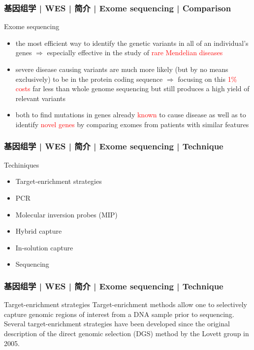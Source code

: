 \begin{frame}
  \frametitle{基因组学 | WES | 简介 | Exome sequencing | Comparison}
  \begin{block}{Exome sequencing}
    \begin{itemize}
      \item the most efficient way to identify the genetic variants in all of an individual's genes $\Rightarrow$ especially effective in the study of \textcolor{red}{rare Mendelian diseases}
      \item severe disease causing variants are much more likely (but by no means exclusively) to be in the protein coding sequence $\Rightarrow$ focusing on this \textcolor{red}{1\% costs} far less than whole genome sequencing but still produces a high yield of relevant variants
      \item both to find mutations in genes already \textcolor{red}{known} to cause disease as well as to identify \textcolor{red}{novel genes} by comparing exomes from patients with similar features
    \end{itemize}
  \end{block}
\end{frame}

\begin{frame}
  \frametitle{基因组学 | WES | 简介 | Exome sequencing | Technique}
  \begin{block}{Techiniques}
    \begin{itemize}
      \item Target-enrichment strategies
      \item PCR
      \item Molecular inversion probes (MIP)
      \item Hybrid capture
      \item In-solution capture
      \item Sequencing
    \end{itemize}
  \end{block}
\end{frame}

\begin{frame}
  \frametitle{基因组学 | WES | 简介 | Exome sequencing | Technique}
  \begin{block}{Target-enrichment strategies}
    Target-enrichment methods allow one to selectively capture genomic regions of interest from a DNA sample prior to sequencing. Several target-enrichment strategies have been developed since the original description of the direct genomic selection (DGS) method by the Lovett group in 2005.
  \end{block}
\end{frame}

